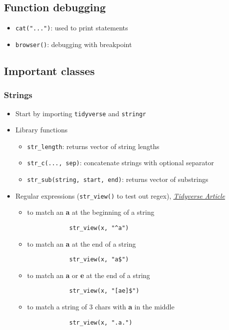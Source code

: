 \documentclass{article}
\begin{document}
\begin{multicols}{2}
\subsection*{Function debugging}
\begin{itemize}
	\item \texttt{cat("...")}: used to print statements
	\item \texttt{browser()}: debugging with breakpoint
\end{itemize}
\subsection*{Important classes}
\subsubsection*{Strings}
\begin{itemize}
	\item Start by importing \texttt{tidyverse} and \texttt{stringr}
	\item Library functions
	\begin{itemize}
		\item \texttt{str\_length}: returns vector of string lengths
		\item \texttt{str\_c(..., sep)}: concatenate strings with optional separator
		\item \texttt{str\_sub(string, start, end)}: returns vector of substrings
	\end{itemize}
	\item Regular expressions (\texttt{str\_view()} to test out regex), \href{https://stringr.tidyverse.org/articles/regular-expressions.html}{\textit{\underline{Tidyverse Article}}}
	\begin{itemize}
		\item to match an \textbf{a} at the beginning of a string
		\begin{verbatim}
			str_view(x, "^a")
		\end{verbatim}
		\item to match an \textbf{a} at the end of a string
		\begin{verbatim}
			str_view(x, "a$")
		\end{verbatim}
		\item to match an \textbf{a} or \textbf{e} at the end of a string
		\begin{verbatim}
			str_view(x, "[ae]$")
		\end{verbatim}
		\item to match a string of 3 chars with \textbf{a} in the middle
		\begin{verbatim}
			str_view(x, ".a.")
		\end{verbatim}


\end{itemize}
\end{itemize}
\end{multicols}
\end{document}
